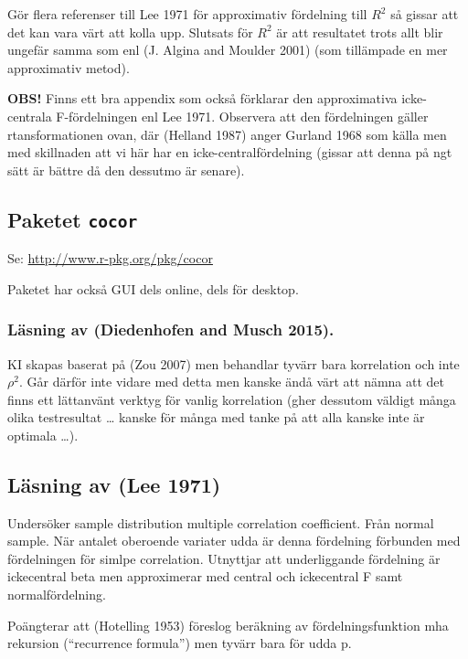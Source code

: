 \documentclass[]{article}
\begin{document}
Gör flera referenser till Lee 1971 för approximativ fördelning till
\(R^2\) så gissar att det kan vara värt att kolla upp. Slutsats för
\(R^2\) är att resultatet trots allt blir ungefär samma som enl (J.
Algina and Moulder 2001) (som tillämpade en mer approximativ metod).

\textbf{OBS!} Finns ett bra appendix som också förklarar den
approximativa icke-centrala F-fördelningen enl Lee 1971. Observera att
den fördelningen gäller rtansformationen ovan, där (Helland 1987) anger
Gurland 1968 som källa men med skillnaden att vi här har en
icke-centralfördelning (gissar att denna på ngt sätt är bättre då den
dessutmo är senare).

\subsection{\texorpdfstring{Paketet
\texttt{cocor}}{Paketet cocor}}\label{paketet-cocor}

Se: \url{http://www.r-pkg.org/pkg/cocor}

Paketet har också GUI dels online, dels för desktop.

\subsubsection{Läsning av (Diedenhofen and Musch
2015).}\label{lasning-av-diedenhofen2015.}

KI skapas baserat på (Zou 2007) men behandlar tyvärr bara korrelation
och inte \(\rho^2\). Går därför inte vidare med detta men kanske ändå
värt att nämna att det finns ett lättanvänt verktyg för vanlig
korrelation (gher dessutom väldigt många olika testresultat \ldots{}
kanske för många med tanke på att alla kanske inte är optimala
\ldots{}).

\subsection{Läsning av (Lee 1971)}\label{lasning-av-lee1971}

Undersöker sample distribution multiple correlation coefficient. Från
normal sample. När antalet oberoende variater udda är denna fördelning
förbunden med fördelningen för simlpe correlation. Utnyttjar att
underliggande fördelning är ickecentral beta men approximerar med
central och ickecentral F samt normalfördelning.

Poängterar att (Hotelling 1953) föreslog beräkning av
fördelningsfunktion mha rekursion (``recurrence formula'') men tyvärr
bara för udda p.
\end{document}
